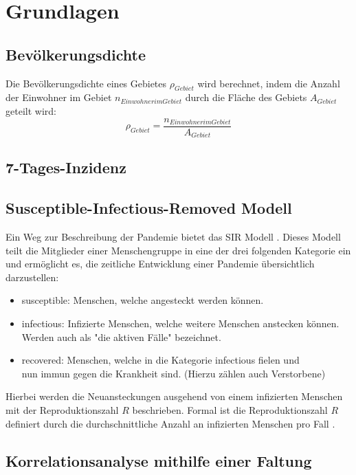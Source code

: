 \chapter{Grundlagen}\label{chap:Grundlagen}
\section{Bevölkerungsdichte}
Die Bevölkerungsdichte eines Gebietes $\rho_{Gebiet}$ wird berechnet, indem die Anzahl der Einwohner im Gebiet $n_{Einwohner im Gebiet}$ durch die Fläche des Gebiets $A_{Gebiet}$ geteilt wird:
\begin{equation}
    \rho_{Gebiet} = \frac{n_{Einwohner im Gebiet}}{A_{Gebiet}}
\end{equation}
\section{7-Tages-Inzidenz}\label{sec:Datenaufbereitung}
\section{Susceptible-Infectious-Removed Modell}
Ein Weg zur Beschreibung der Pandemie bietet das SIR Modell \autocite{SIR}. Dieses Modell teilt die Mitglieder einer Menschengruppe in eine der drei folgenden Kategorie ein und ermöglicht es, die zeitliche Entwicklung einer Pandemie übersichtlich darzustellen:
\begin{itemize}
    \item \glqq{}susceptible\grqq{}: Menschen, welche angesteckt werden können.
    \item \glqq{}infectious\grqq{}: Infizierte Menschen, welche weitere Menschen anstecken können. Werden auch als "die aktiven Fälle" bezeichnet.
    \item \glqq{}recovered\grqq{}: Menschen, welche in die Kategorie \glqq{}infectious\grqq{} fielen und\\
    nun immun gegen die Krankheit sind. (Hierzu zählen auch Verstorbene)
\end{itemize}
Hierbei werden die Neuansteckungen ausgehend von einem infizierten Menschen mit der Reproduktionszahl $R$ beschrieben. Formal ist die Reproduktionszahl $R$ definiert durch die durchschnittliche Anzahl an infizierten Menschen pro Fall \autocite{ReZahl}.


\section{Korrelationsanalyse mithilfe einer Faltung}\label{sec:BeschreibungKorrelationsanalyse}

